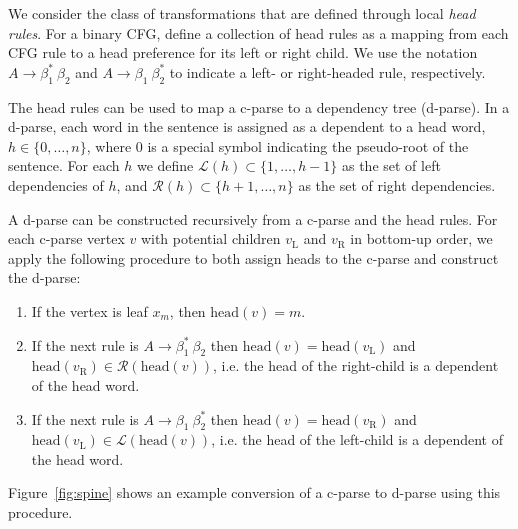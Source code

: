 \documentclass[11pt,letterpaper]{article}
\newcommand{\LeftS}{\mathcal{L} }
\newcommand{\RightS}{\mathcal{R} }
\newcommand{\RuleA}[3]{#1 \rightarrow #2^*\ #3}
\newcommand{\RuleB}[3]{#1 \rightarrow #2\ #3^*}
\newcommand{\Head}{\mathrm{head}}
\begin{document}
We consider the class of transformations that are defined through
local \textit{head rules}.  For a binary CFG, define a collection of head rules
as a mapping from each CFG rule to a head preference for its left or
right child. We use the notation $\RuleA{A}{\beta_1}{\beta_2}$ and
$\RuleB{A}{\beta_1}{\beta_2}$ to indicate a left- or right-headed
rule, respectively.


The head rules can be used to map a c-parse to a dependency tree
(d-parse). In a d-parse, each word in the sentence is assigned as a
dependent to a head word, $h \in \{0, \ldots, n \}$, where $0$ is a
special symbol indicating the pseudo-root of the sentence. For each
$h$ we define $\LeftS(h) \subset \{1, \ldots, h-1\}$ as the set of
left dependencies of $h$, and $\RightS(h) \subset \{h+1, \ldots, n\}$
as the set of right dependencies.

A d-parse can be constructed recursively from a c-parse and the head
rules. For each c-parse vertex $v$ with potential children $v_{\mathrm{L}}$ and
$v_{\mathrm{R}}$ in bottom-up order, we apply the following procedure 
to both assign heads to the c-parse and construct the d-parse:

 
 \begin{enumerate}
  \item  If the vertex is leaf $x_m$, then $\Head(v)=m$.
  \item  If the next rule is $\RuleA{A}{\beta_1}{\beta_2}$ then 
    $\Head(v) = \Head(v_{\mathrm{L}})$ and $\Head(v_{\mathrm{R}}) \in \RightS(\Head(v))$, i.e. 
    the head of the right-child is a dependent of the head word.
  \item  If the next rule is $\RuleB{A}{\beta_1}{\beta_2}$ then 
    $\Head(v) = \Head(v_{\mathrm{R}})$ and $\Head(v_{\mathrm{L}}) \in \LeftS(\Head(v))$,  i.e. 
    the head of the left-child is a dependent of the head word.
  \end{enumerate}


  \noindent Figure~\ref{fig:spine} shows an example conversion of 
   a c-parse to d-parse using this procedure. 
\end{document}
